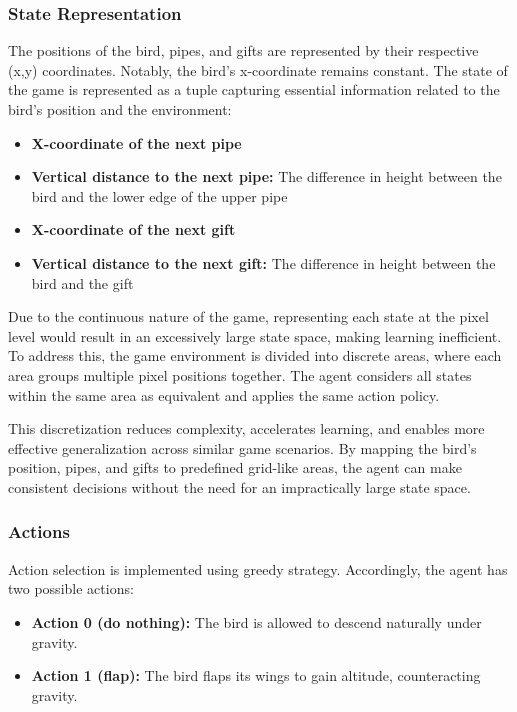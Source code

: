\documentclass[conference]{IEEEtran}
\begin{document}
\subsubsection{State Representation}
The positions of the bird, pipes, and gifts are represented by their respective (x,y) coordinates. Notably, the bird's x-coordinate remains constant. The state of the game is represented as a tuple capturing essential information related to the bird's position and the environment:
\begin{itemize}
    \item \textbf{X-coordinate of the next pipe}
    \item \textbf{Vertical distance to the next pipe:} The difference in height between the bird and the lower edge of the upper pipe
    \item \textbf{X-coordinate of the next gift}
    \item \textbf{Vertical distance to the next gift:} The difference in height between the bird and the gift
\end{itemize}
Due to the continuous nature of the game, representing each state at the pixel level would result in an excessively large state space, making learning inefficient. To address this, the game environment is divided into discrete areas, where each area groups multiple pixel positions together. The agent considers all states within the same area as equivalent and applies the same action policy. 

This discretization reduces complexity, accelerates learning, and enables more effective generalization across similar game scenarios. By mapping the bird’s position, pipes, and gifts to predefined grid-like areas, the agent can make consistent decisions without the need for an impractically large state space.

\subsubsection{Actions}
Action selection is implemented using greedy strategy. Accordingly, the agent has two possible actions:
\begin{itemize}
    \item \textbf{Action 0 (do nothing):} The bird is allowed to descend naturally under gravity.
    \item \textbf{Action 1 (flap):} The bird flaps its wings to gain altitude, counteracting gravity.
\end{itemize}
\end{document}
